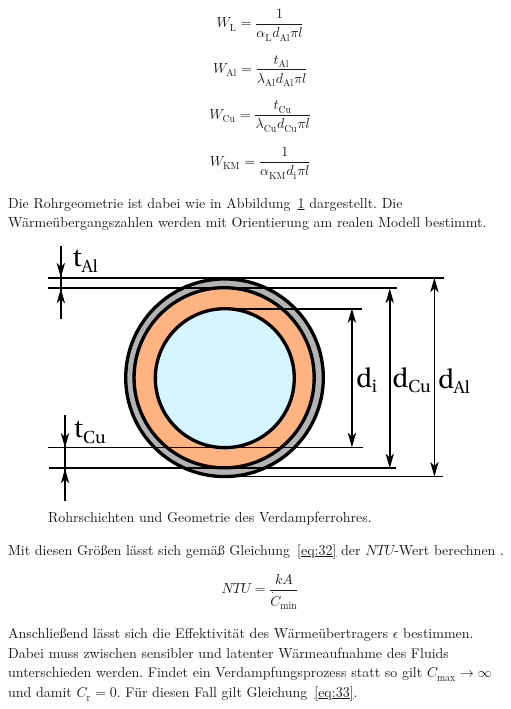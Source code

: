 \begin{equation}
\label{eq:28}
W_\mathrm{L} = \frac{1}{\alpha_{\mathrm{L}} d_{\mathrm{Al}} \pi l}
\end{equation}

\begin{equation}
\label{eq:29}
W_{\mathrm{Al}} = \frac{t_{\mathrm{Al}}}{\lambda_{\mathrm{Al}} d_{\mathrm{Al}} \pi l}
\end{equation}

\begin{equation}
\label{eq:30}
W_{\mathrm{Cu}} = \frac{t_{\mathrm{Cu}}}{\lambda_{\mathrm{Cu}} d_{\mathrm{Cu}} \pi l}
\end{equation}

\begin{equation}
\label{eq:31}
W_{\mathrm{KM}} = \frac{1}{\alpha_{\mathrm{KM}} d_{\mathrm{i}} \pi l}
\end{equation}

Die Rohrgeometrie ist dabei wie in Abbildung~\ref{fig:Geometrie} dargestellt.
Die Wärmeübergangszahlen werden mit Orientierung am realen Modell bestimmt.

\begin{figure}[h]
\centering
\includegraphics[scale=1]{Pictures/Rohrgeometrie.pdf}
\caption{Rohrschichten und Geometrie des Verdampferrohres.}
\label{fig:Geometrie}
\end{figure}



Mit diesen Größen lässt sich gemäß Gleichung~\ref{eq:32} der $NTU$-Wert berechnen \cite{McDonald.2012}.

\begin{equation}
\label{eq:32}
NTU = \frac{kA}{\dot{C}_\mathrm{min}}
\end{equation}

Anschließend lässt sich die Effektivität des Wärmeübertragers $\epsilon$ bestimmen.
Dabei muss zwischen sensibler und latenter Wärmeaufnahme des Fluids unterschieden werden. Findet ein Verdampfungsprozess statt so gilt $C_{\mathrm{max}}\longrightarrow\infty$ und damit $C_\mathrm{r} =0$. Für diesen Fall gilt Gleichung~\ref{eq:33}.

